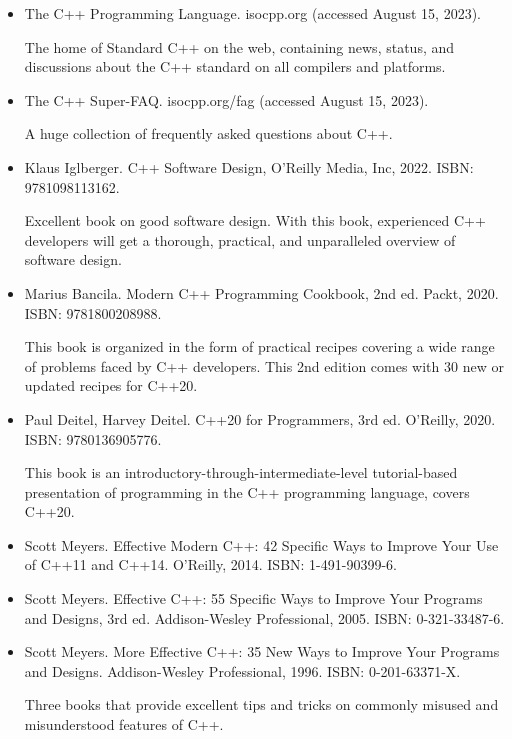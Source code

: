 \begin{itemize}
\item
The C++ Programming Language. isocpp.org (accessed August 15, 2023).

The home of Standard C++ on the web, containing news, status, and discussions about the C++ standard on all compilers and platforms.

\item
The C++ Super-FAQ. isocpp.org/fag (accessed August 15, 2023).

A huge collection of frequently asked questions about C++.

\item
Klaus Iglberger. C++ Software Design, O’Reilly Media, Inc, 2022. ISBN: 9781098113162.

Excellent book on good software design. With this book, experienced C++ developers will get a thorough, practical, and unparalleled overview of software design.

\item
Marius Bancila. Modern C++ Programming Cookbook, 2nd ed. Packt, 2020. ISBN: 9781800208988.

This book is organized in the form of practical recipes covering a wide range of problems faced by C++ developers. This 2nd edition comes with 30 new or updated recipes for C++20.

\item
Paul Deitel, Harvey Deitel. C++20 for Programmers, 3rd ed. O’Reilly, 2020. ISBN: 9780136905776.

This book is an introductory-through-intermediate-level tutorial-based presentation of programming in the C++ programming language, covers C++20.

\item
Scott Meyers. Effective Modern C++: 42 Specific Ways to Improve Your Use of C++11 and C++14. O’Reilly, 2014. ISBN: 1-491-90399-6.

\item
Scott Meyers. Effective C++: 55 Specific Ways to Improve Your Programs and Designs, 3rd ed. Addison-Wesley Professional, 2005. ISBN: 0-321-33487-6.

\item
Scott Meyers. More Effective C++: 35 New Ways to Improve Your Programs and Designs. Addison-Wesley Professional, 1996. ISBN: 0-201-63371-X.

Three books that provide excellent tips and tricks on commonly misused and misunderstood features of C++.


\end{itemize}
